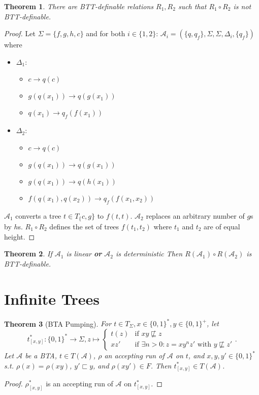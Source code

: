 \documentclass{article}
\newtheorem{theorem}{Theorem}[section]
\begin{document}
\begin{theorem}
	There are BTT-definable relations $R_1, R_2$ such that $R_1 \circ R_2$ is not BTT-definable.
\end{theorem}
\begin{proof}
	Let $\Sigma = \{f,g,h,c\}$ and for both $i \in \{1,2\}$: $\mathcal{A}_i = (\{q,q_f\}, \Sigma, \Sigma, \Delta_i, \{q_f\})$ where 
	\begin{itemize}
		\item $\Delta_1$:
		\begin{itemize}
			\item $c \rightarrow q(c)$
			\item $g(q(x_1)) \rightarrow q(g(x_1))$
			\item $q(x_1) \rightarrow q_f(f(x_1))$
		\end{itemize}
		\item $\Delta_2$:
		\begin{itemize}
			\item $c \rightarrow q(c)$
			\item $g(q(x_1)) \rightarrow q(g(x_1))$
			\item $g(q(x_1)) \rightarrow q(h(x_1))$
			\item $f(q(x_1), q(x_2)) \rightarrow q_f(f(x_1, x_2))$
		\end{itemize}
	\end{itemize}
	
	$\mathcal{A}_1$ converts a tree $t \in T_\{c,g\}$ to $f(t, t)$.
	$\mathcal{A}_2$ replaces an arbitrary number of $g$s by $h$s.
	$R_1 \circ R_2$ defines the set of trees $f(t_1, t_2)$ where $t_1$ and $t_2$ are of equal height.
\end{proof}

\begin{theorem}
	If $\mathcal{A}_1$ is linear \textbf{or} $\mathcal{A}_2$ is deterministic Then $R(\mathcal{A}_1) \circ R(\mathcal{A}_2)$ is BTT-definable.
\end{theorem}


\section{Infinite Trees}
\begin{theorem}[BTA Pumping]
	For $t \in T_\Sigma, x \in \{0,1\}^*, y \in \{0,1\}^+$, let 
	$$t^*_{[x,y]} : \{0,1\}^* \rightarrow \Sigma, z \mapsto \begin{cases} t(z) & \text{if } xy \not\sqsubseteq z \\ xz' & \text{if } \exists n>0: z = xy^nz' \text{ with } y \not\sqsubseteq z' \end{cases}.$$
	Let $\mathcal{A}$ be a BTA, $t \in T(\mathcal{A})$, $\rho$ an accepting run of $\mathcal{A}$ on $t$, and $x, y, y' \in \{0,1\}^*$ s.t. $\rho(x) = \rho(xy)$, $y' \sqsubset y$, and $\rho(xy') \in F$. Then $t^*_{[x,y]} \in T(\mathcal{A})$.
\end{theorem}
\begin{proof}
	$\rho^*_{[x,y]}$ is an accepting run of $\mathcal{A}$ on $t^*_{[x,y]}$.
\end{proof}
\end{document}
